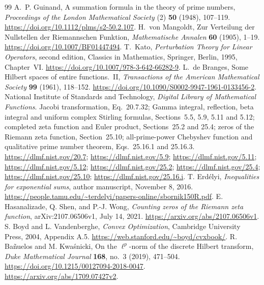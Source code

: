 \documentclass[11pt,a4paper]{article}
\numberwithin{equation}{section}
\theoremstyle{definition}\newtheorem{definition}[theorem]{Definition}
\theoremstyle{remark}\newtheorem{remark}[theorem]{Remark}
\begin{document}
\begin{thebibliography}{99}\small
{}
A.~P. Guinand, A summation formula in the theory of prime numbers,
\emph{Proceedings of the London Mathematical Society} (2) \textbf{50} (1948), 107--119.
\url{https://doi.org/10.1112/plms/s2-50.2.107}.
H.~von Mangoldt, Zur Verteilung der Nullstellen der Riemannschen Funktion,
\emph{Mathematische Annalen} \textbf{60} (1905), 1--19.
\url{https://doi.org/10.1007/BF01447494}.
T.~Kato, \emph{Perturbation Theory for Linear Operators}, second edition,
Classics in Mathematics, Springer, Berlin, 1995, Chapter~VI.
\url{https://doi.org/10.1007/978-3-642-66282-9}.
L.~de Branges, Some Hilbert spaces of entire functions.~II,
\emph{Transactions of the American Mathematical Society} \textbf{99} (1961), 118--152.
\url{https://doi.org/10.1090/S0002-9947-1961-0133456-2}.
National Institute of Standards and Technology, \emph{Digital Library of Mathematical Functions}.
Jacobi transformation, Eq.~20.7.32; Gamma integral, reflection, beta integral and uniform complex Stirling formulas, Sections~5.5, 5.9, 5.11 and 5.12; completed zeta function and Euler product, Sections~25.2 and 25.4; zeros of the Riemann zeta function, Section~25.10; all-prime-power Chebyshev function and qualitative prime number theorem, Eqs.~25.16.1 and 25.16.3.
\url{https://dlmf.nist.gov/20.7}; \url{https://dlmf.nist.gov/5.9};
\url{https://dlmf.nist.gov/5.11}; \url{https://dlmf.nist.gov/5.12};
\url{https://dlmf.nist.gov/25.2}; \url{https://dlmf.nist.gov/25.4}; \url{https://dlmf.nist.gov/25.10}; \url{https://dlmf.nist.gov/25.16.i}.
T. Erd\'elyi, \emph{Inequalities for exponential sums}, author manuscript, November 8, 2016.
\url{https://people.tamu.edu/~terdelyi/papers-online/sbornik150R.pdf}.
E. Hasanalizade, Q. Shen, and P.-J. Wong, \emph{Counting zeros of the Riemann zeta function}, arXiv:2107.06506v1, July 14, 2021.
\url{https://arxiv.org/abs/2107.06506v1}.
S. Boyd and L. Vandenberghe, \emph{Convex Optimization}, Cambridge University Press, 2004, Appendix A.5.
\url{https://web.stanford.edu/~boyd/cvxbook/}.
R. Ba\~nuelos and M. Kwa\'snicki, On the $\ell^p$-norm of the discrete Hilbert transform,
\emph{Duke Mathematical Journal} \textbf{168}, no.~3 (2019), 471--504.
\url{https://doi.org/10.1215/00127094-2018-0047}.
\url{https://arxiv.org/abs/1709.07427v2}.


\end{thebibliography}
\end{document}
